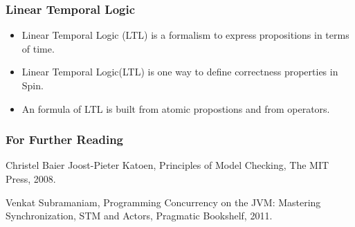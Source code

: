 \documentclass{beamer}
\begin{document}
\begin{frame}
  \frametitle{Linear Temporal Logic}
  \begin{itemize}
 \item Linear Temporal Logic (LTL) is a formalism to express propositions in terms of time.
  \item  Linear Temporal Logic(LTL) is one way to define correctness properties in Spin.
  \item An formula of LTL is built from atomic propostions and from operators.

  \end{itemize}
\end{frame}
\begin{frame}
  \frametitle{For Further Reading}

  \begin{thebibliography}{Subramaniam, 2011}

Christel Baier Joost-Pieter Katoen,
Principles of Model Checking,
The MIT Press,
2008.

Venkat Subramaniam,
Programming Concurrency on the JVM: Mastering Synchronization, STM and Actors,
Pragmatic Bookshelf,
2011.

\end{thebibliography}
\end{frame}
\end{document}

